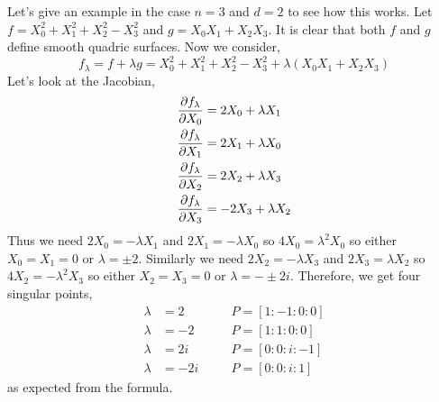 \documentclass[12pt]{article}
\begin{document}
\begin{example}
Let's give an example in the case $n = 3$ and $d = 2$ to see how this works. Let $f = X_0^2 + X_1^2 + X_2^2 - X_3^2$ and $g = X_0 X_1 + X_2 X_3$. It is clear that both $f$ and $g$ define smooth quadric surfaces. Now we consider,
\[ f_{\lambda} = f + \lambda g = X_0^2 + X_1^2 + X_2^2 - X_3^2 + \lambda (X_0 X_1 + X_2 X_3) \]
Let's look at the Jacobian,
\begin{align*}
\frac{\partial{f_\lambda}}{\partial{X_0}} & = 2 X_0 + \lambda X_1
\\
\frac{\partial{f_\lambda}}{\partial{X_1}} & = 2 X_1 + \lambda X_0
\\
\frac{\partial{f_\lambda}}{\partial{X_2}} & = 2 X_2 + \lambda X_3
\\
\frac{\partial{f_\lambda}}{\partial{X_3}} & = -2 X_3 + \lambda X_2
\end{align*}
Thus we need $2 X_0 = - \lambda X_1$ and $2 X_1 = - \lambda X_0$ so $4 X_0 = \lambda^2 X_0$ so either $X_0 = X_1 = 0$ or $\lambda = \pm 2$. Similarly we need $2 X_2 = - \lambda X_3$ and $2 X_3 = \lambda X_2$ so $4 X_2 = - \lambda^2 X_3$ so either $X_2 = X_3 = 0$ or $\lambda = - \pm 2i$. Therefore, we get four singular points,
\begin{align*}
\lambda &= 2 \quad && P = [1 : -1 : 0 : 0]
\\
\lambda &= -2 \quad && P = [1 : 1 : 0 : 0]
\\
\lambda &= 2 i \quad && P = [0 : 0 : i : -1]
\\
\lambda & = -2i \quad && P = [0 : 0 : i : 1]
\end{align*}
as expected from the formula.
\end{example}
\end{document}
